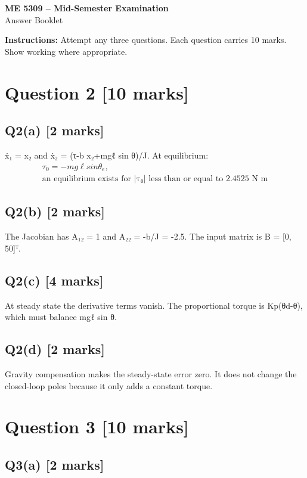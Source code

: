\documentclass[11pt,a4paper]{article}
\begin{document}
\begin{center}
{\Large\bfseries ME 5309 -- Mid-Semester Examination}\\[3pt]
{\large Answer Booklet}\\[8pt]
\end{center}
\textbf{Instructions:} Attempt any three questions. Each question carries 10 marks. Show working where appropriate.
\section*{Question 2 \hfill [10 marks]}
\subsection*{Q2(a) \hfill [2 marks]}

ẋ₁ = x₂ and ẋ₂ = (τ-b x₂+mgℓ sin θ)/J.
At equilibrium:\[\begin{aligned}τ_0 = -mg\ell sin \theta_e,\\ \text{an equilibrium exists for |τ₀| less than or equal to 2.4525 N m}\end{aligned}\]

\subsection*{Q2(b) \hfill [2 marks]}

The Jacobian has A₁₂ = 1 and A₂₂ = -b/J = -2.5.
The input matrix is B = [0, 50]ᵀ.

\subsection*{Q2(c) \hfill [4 marks]}

At steady state the derivative terms vanish.
The proportional torque is Kp(θd-θ), which must balance mgℓ sin θ.

\subsection*{Q2(d) \hfill [2 marks]}

Gravity compensation makes the steady-state error zero.
It does not change the closed-loop poles because it only adds a constant torque.

\section*{Question 3 \hfill [10 marks]}
\subsection*{Q3(a) \hfill [2 marks]}
\end{document}

